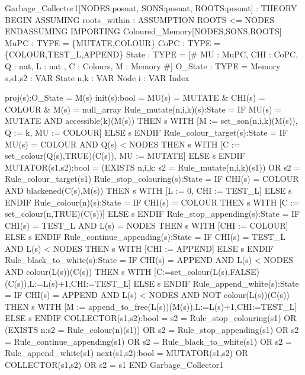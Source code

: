\begin{smallsession}
Garbage_Collector1[NODES:posnat, SONS:posnat, ROOTS:posnat] : THEORY
BEGIN
  ASSUMING roots_within : ASSUMPTION ROOTS <= NODES ENDASSUMING
  IMPORTING Coloured_Memory[NODES,SONS,ROOTS]
  MuPC    : TYPE = \{MUTATE,COLOUR\}  
  CoPC    : TYPE = \{COLOUR,TEST_L,APPEND\}
  State   : TYPE = [# MU : MuPC, CHI : CoPC, 
                      Q : nat, L : nat , C : Colours, M : Memory #]
  O_State : TYPE = Memory 
  s,s1,s2 : VAR State n,k : VAR Node i : VAR Index

  proj(s):O_State = M(s)
  init(s):bool = MU(s) = MUTATE & CHI(s) = COLOUR & M(s) = null_array
  Rule_mutate(n,i,k)(s):State =
    IF MU(s) = MUTATE AND accessible(k)(M(s)) THEN 
      s WITH [M := set_son(n,i,k)(M(s)), Q := k, MU := COLOUR] 
    ELSE s ENDIF
  Rule_colour_target(s):State =
    IF MU(s) = COLOUR AND Q(s) < NODES THEN 
      s WITH [C := set_colour(Q(s),TRUE)(C(s)), MU := MUTATE] 
    ELSE s ENDIF
  MUTATOR(s1,s2):bool =
    (EXISTS n,i,k: s2 = Rule_mutate(n,i,k)(s1)) OR 
    s2 = Rule_colour_target(s1)
  Rule_stop_colouring(s):State =
    IF CHI(s) = COLOUR AND blackened(C(s),M(s)) THEN
      s WITH [L := 0, CHI := TEST_L] ELSE s ENDIF
  Rule_colour(n)(s):State =
    IF CHI(s) = COLOUR THEN
      s WITH [C := set_colour(n,TRUE)(C(s))] ELSE s ENDIF
  Rule_stop_appending(s):State =
    IF CHI(s) = TEST_L AND L(s) = NODES THEN
      s WITH [CHI := COLOUR] ELSE s ENDIF
  Rule_continue_appending(s):State =
    IF CHI(s) = TEST_L AND L(s) < NODES THEN
      s WITH [CHI := APPEND] ELSE s ENDIF
  Rule_black_to_white(s):State =
    IF CHI(s) = APPEND AND L(s) < NODES AND colour(L(s))(C(s)) THEN
      s WITH [C:=set_colour(L(s),FALSE)(C(s)),L:=L(s)+1,CHI:=TEST_L]
    ELSE s ENDIF
  Rule_append_white(s):State =
    IF CHI(s) = APPEND AND L(s) < NODES AND NOT colour(L(s))(C(s)) THEN
      s WITH [M := append_to_free(L(s))(M(s)),L:=L(s)+1,CHI:=TEST_L]
    ELSE s ENDIF
  COLLECTOR(s1,s2):bool = 
      s2 = Rule_stop_colouring(s1) OR (EXISTS n:s2 = Rule_colour(n)(s1))
   OR s2 = Rule_stop_appending(s1) OR s2 = Rule_continue_appending(s1) 
   OR s2 = Rule_black_to_white(s1) OR s2 = Rule_append_white(s1)
  next(s1,s2):bool = MUTATOR(s1,s2) OR COLLECTOR(s1,s2) OR s2 = s1
END Garbage_Collector1
\end{smallsession}
\label{pvs-refinement1}


